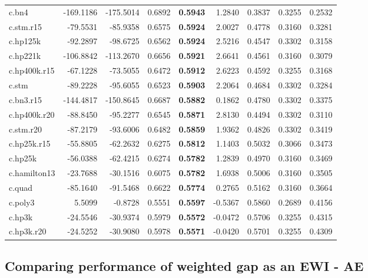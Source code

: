 \documentclass[
  12pt,
]{article}
\begin{document}
\begin{table}[H]
{\begin{tabular}[t]{lrrr>{}rrrrr}
\addlinespace
c.bn4 & -169.1186 & -175.5014 & 0.6892 & \textbf{0.5943} & 1.2840 & 0.3837 & 0.3255 & 0.2532\\
c.stm.r15 & -79.5531 & -85.9358 & 0.6575 & \textbf{0.5924} & 2.0027 & 0.4778 & 0.3160 & 0.3281\\
c.hp125k & -92.2897 & -98.6725 & 0.6562 & \textbf{0.5924} & 2.5216 & 0.4547 & 0.3302 & 0.3158\\
c.hp221k & -106.8842 & -113.2670 & 0.6656 & \textbf{0.5921} & 2.6641 & 0.4561 & 0.3160 & 0.3079\\
c.hp400k.r15 & -67.1228 & -73.5055 & 0.6472 & \textbf{0.5912} & 2.6223 & 0.4592 & 0.3255 & 0.3168\\
\addlinespace
c.stm & -89.2228 & -95.6055 & 0.6523 & \textbf{0.5903} & 2.2064 & 0.4684 & 0.3302 & 0.3284\\
c.bn3.r15 & -144.4817 & -150.8645 & 0.6687 & \textbf{0.5882} & 0.1862 & 0.4780 & 0.3302 & 0.3375\\
c.hp400k.r20 & -88.8450 & -95.2277 & 0.6545 & \textbf{0.5871} & 2.8130 & 0.4494 & 0.3302 & 0.3110\\
c.stm.r20 & -87.2179 & -93.6006 & 0.6482 & \textbf{0.5859} & 1.9362 & 0.4826 & 0.3302 & 0.3419\\
c.hp25k.r15 & -55.8805 & -62.2632 & 0.6275 & \textbf{0.5812} & 1.1403 & 0.5032 & 0.3066 & 0.3473\\
\addlinespace
c.hp25k & -56.0388 & -62.4215 & 0.6274 & \textbf{0.5782} & 1.2839 & 0.4970 & 0.3160 & 0.3469\\
c.hamilton13 & -23.7688 & -30.1516 & 0.6075 & \textbf{0.5782} & 1.6938 & 0.5006 & 0.3160 & 0.3505\\
c.quad & -85.1640 & -91.5468 & 0.6622 & \textbf{0.5774} & 0.2765 & 0.5162 & 0.3160 & 0.3664\\
c.poly3 & 5.5099 & -0.8728 & 0.5551 & \textbf{0.5597} & -0.5367 & 0.5860 & 0.2689 & 0.4156\\
c.hp3k & -24.5546 & -30.9374 & 0.5979 & \textbf{0.5572} & -0.0472 & 0.5706 & 0.3255 & 0.4315\\
\addlinespace
c.hp3k.r20 & -24.5252 & -30.9080 & 0.5978 & \textbf{0.5571} & -0.0420 & 0.5701 & 0.3255 & 0.4309\\
\bottomrule
\end{tabular}}
\end{table}

\hypertarget{comparing-performance-of-weighted-gap-as-an-ewi---ae}{%
\subsection{Comparing performance of weighted gap as an EWI - AE}\label{comparing-performance-of-weighted-gap-as-an-ewi---ae}}
\end{document}
